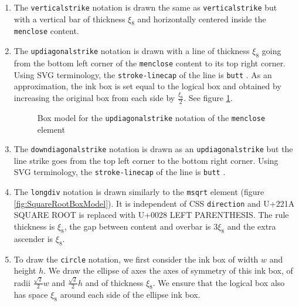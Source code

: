 \begin{enumerate}
\item The {\tt verticalstrike} notation is drawn the same as
  {\tt verticalstrike} but with a vertical bar
  of thickness $\xi_8$ and horizontally centered inside the {\tt menclose}
  content.
\item The {\tt updiagonalstrike} notation is drawn with a line
  of thickness $\xi_8$  going from the bottom left corner of the {\tt menclose}
  content to its top right corner. Using SVG terminology, the
  {\tt stroke-linecap} of the line is {\tt butt} \cite{SVG11}.
  As an approximation, the ink box
  is set equal to the logical box and obtained by increasing the original box
  from each side by $\frac{\xi_8}{2}$.
  See figure \ref{fig:MencloseUpDiagonalStrikeBoxModel}.

  \begin{figure}
\centering
{}
  \caption{Box model for the {\tt updiagonalstrike}
    notation of the {\tt menclose} element}
\label{fig:MencloseUpDiagonalStrikeBoxModel}
\end{figure}

\item The {\tt downdiagonalstrike} notation is drawn as an
  {\tt updiagonalstrike}
  but the line strike goes from the top left corner to the bottom right corner.
  Using SVG terminology, the
  {\tt stroke-linecap} of the line is {\tt butt} \cite{SVG11}.
\item The {\tt longdiv} notation is drawn similarly to the {\tt msqrt} element
  (figure \ref{fig:SquareRootBoxModel}). It is independent of CSS
  {\tt direction} and U+221A SQUARE ROOT is replaced with
  U+0028 LEFT PARENTHESIS. The rule thickness is $\xi_8$,
  the gap between content and overbar is $3\xi_8$ and the extra ascender
  is $\xi_8$.
\item  To draw the {\tt circle} notation, we first consider the ink box of
  width $w$ and height $h$. We draw the ellipse
  of axes the axes of symmetry of this ink box, of radii
  $\frac{\sqrt{2}}{2} w$ and $\frac{\sqrt{2}}{2} h$ and of thickness $\xi_8$.
  We ensure that the logical box also has space $\xi_8$ around each side
  of the ellipse ink box.
  \begin{figure}
\centering
\begin{tikzpicture}[yscale=-1]


\end{tikzpicture}
\end{figure}
\end{enumerate}
